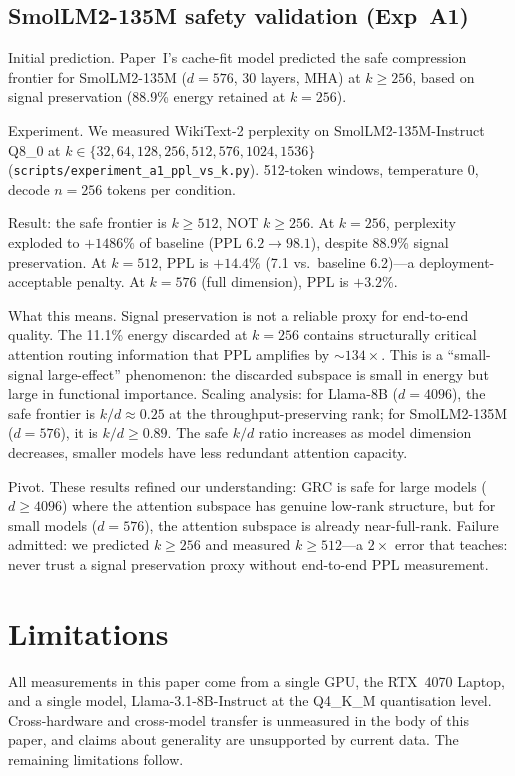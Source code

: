 \documentclass[11pt]{article}
\begin{document}
\subsection{SmolLM2-135M safety validation (Exp~A1)}
\label{sec:smollm2-a1}

Initial prediction. Paper~I's cache-fit model predicted the
safe compression frontier for SmolLM2-135M ($d{=}576$, 30 layers, MHA)
at $k{\ge}256$, based on signal preservation (88.9\% energy retained at
$k{=}256$).

Experiment. We measured WikiText-2 perplexity on
SmolLM2-135M-Instruct Q8\_0 at $k\in\{32,64,128,256,512,576,1024,1536\}$
(\texttt{scripts/experiment\_a1\_ppl\_vs\_k.py}).  512-token windows,
temperature 0, decode $n{=}256$ tokens per condition.

Result: the safe frontier is $k{\ge}512$, NOT $k{\ge}256$.
At $k{=}256$, perplexity exploded to $+1486\%$ of baseline
(PPL $6.2\to98.1$), despite 88.9\% signal preservation.  At $k{=}512$,
PPL is $+14.4\%$ (7.1 vs.\ baseline 6.2)---a deployment-acceptable
penalty.  At $k{=}576$ (full dimension), PPL is $+3.2\%$.

What this means.  Signal preservation is not a reliable
proxy for end-to-end quality.  The 11.1\% energy discarded at $k{=}256$
contains structurally critical attention routing information that PPL
amplifies by ${\sim}134\times$.  This is a ``small-signal large-effect''
phenomenon: the discarded subspace is small in energy but large in
functional importance.  Scaling analysis: for Llama-8B ($d{=}4096$),
the safe frontier is $k/d{\approx}0.25$ at the throughput-preserving
rank; for SmolLM2-135M ($d{=}576$), it is $k/d{\ge}0.89$.  The safe
$k/d$ ratio increases as model dimension decreases, smaller models have
less redundant attention capacity.

Pivot.  These results refined our understanding: GRC is safe for
large models ($d{\ge}4096$) where the attention subspace has genuine
low-rank structure, but for small models ($d{=}576$), the attention
subspace is already near-full-rank.  Failure admitted: we
predicted $k{\ge}256$ and measured $k{\ge}512$---a $2{\times}$ error that
teaches: never trust a signal preservation proxy without end-to-end
PPL measurement.

\section{Limitations}
\label{sec:limits}

All measurements in this paper come from a single GPU, the RTX~4070
Laptop, and a single model, Llama-3.1-8B-Instruct at the Q4\_K\_M
quantisation level. Cross-hardware and cross-model transfer is unmeasured
in the body of this paper, and claims about generality are unsupported by
current data. The remaining limitations follow.
\end{document}
